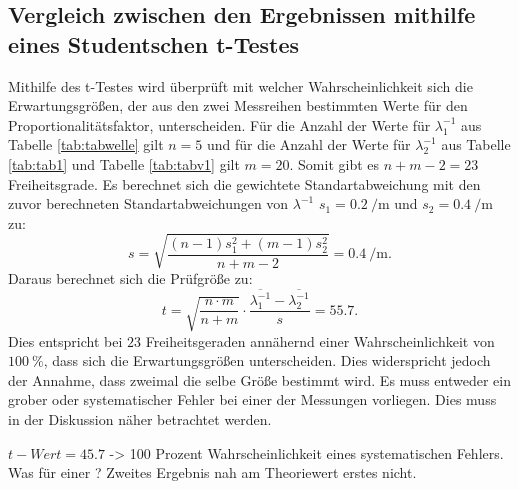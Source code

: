 \subsection{Vergleich zwischen den Ergebnissen mithilfe eines Studentschen t-Testes}
Mithilfe des t-Testes wird überprüft mit welcher Wahrscheinlichkeit sich die Erwartungsgrößen, der aus den zwei Messreihen bestimmten Werte für den Proportionalitätsfaktor, unterscheiden. Für die Anzahl der Werte für $\lambda_1 ^{-1}$ aus Tabelle \ref{tab:tabwelle} gilt $n=5$ und für die Anzahl der Werte für $\lambda_2 ^{-1}$ aus Tabelle \ref{tab:tab1} und Tabelle \ref{tab:tabv1} gilt $m=20$. Somit gibt es $n+m-2=23$ Freiheitsgrade. Es berechnet sich die gewichtete Standartabweichung mit den zuvor berechneten Standartabweichungen von $\lambda ^{-1}$ $s_1 = \SI{0.2}{\per\meter}$ und $s_2 = \SI{0.4}{\per\meter}$ zu:
\begin{displaymath}
	s = \sqrt{\frac{(n-1)s_1^2+(m-1)s_2^2}{n+m-2}} = \SI{0.4}{\per\meter}\text{.}
\end{displaymath}
Daraus berechnet sich die Prüfgröße zu:
\begin{displaymath}
	t = \sqrt{\frac{n \cdot m}{n+m}} \cdot \frac{\overline{\lambda_1^{-1}} -\overline{\lambda_2^{-1}}}{s} = 55.7\text{.}
\end{displaymath}
Dies entspricht bei $23$ Freiheitsgeraden annähernd einer Wahrscheinlichkeit von $\SI{100}{\percent}$, dass sich die Erwartungsgrößen unterscheiden. Dies widerspricht jedoch der Annahme, dass zweimal die selbe Größe bestimmt wird. Es muss entweder ein grober oder systematischer Fehler bei einer der Messungen vorliegen. Dies muss in der Diskussion näher betrachtet werden.


$t-Wert = 45.7$ -> 100 Prozent Wahrscheinlichkeit eines systematischen Fehlers. Was für einer ? Zweites Ergebnis nah am Theoriewert erstes nicht.

